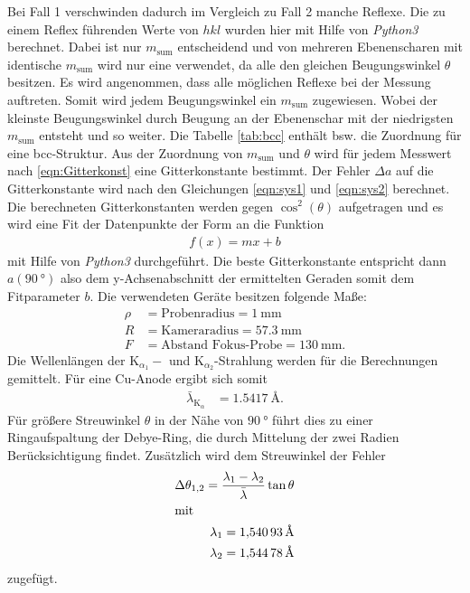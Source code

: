 Bei Fall 1 verschwinden dadurch im Vergleich zu Fall 2 manche
Reflexe.
Die zu einem Reflex führenden Werte von $hkl$ wurden hier mit Hilfe von
\textit{Python3} berechnet. Dabei ist nur $m_{\mathrm{sum}}$ entscheidend
und von mehreren Ebenenscharen mit identische $m_{\mathrm{sum}}$ wird nur eine verwendet,
da alle den gleichen Beugungswinkel $\theta$ besitzen.
Es wird angenommen, dass alle möglichen Reflexe bei der Messung auftreten.
Somit wird jedem Beugungswinkel \theta ein $m_{\mathrm{sum}}$ zugewiesen.
Wobei der kleinste Beugungswinkel durch Beugung an der
Ebenenschar mit der niedrigsten $m_{\mathrm{sum}}$ entsteht und so weiter.
Die Tabelle \ref{tab:bcc} enthält bsw. die Zuordnung für eine bcc-Struktur.
Aus der Zuordnung von $m_{\mathrm{sum}}$ und $\theta$
wird für jedem Messwert nach \eqref{eqn:Gitterkonst}
eine Gitterkonstante bestimmt. Der Fehler $\Delta a$
auf die Gitterkonstante
wird nach den Gleichungen \eqref{eqn:sys1} und \eqref{eqn:sys2}
berechnet. Die berechneten Gitterkonstanten werden
gegen $\cos^2\left(\theta\right)$ aufgetragen und es wird
eine Fit der Datenpunkte der Form an die Funktion
\begin{align}
  f(x)= mx+b
\end{align}
mit Hilfe von \textit{Python3} durchgeführt.
Die beste Gitterkonstante entspricht dann $a(\SI{90}{\degree})$
also dem y-Achsenabschnitt der ermittelten Geraden somit dem Fitparameter $b$.
Die verwendeten Geräte besitzen folgende Maße:
\begin{align*}
  \rho &= \text{Probenradius} = \SI{1}{\milli\meter}\\
  R &= \text{Kameraradius} = \SI{57.3}{\milli\meter}\\
  F &= \text{Abstand Fokus-Probe} = \SI{130}{\milli\meter}.
\end{align*}
Die Wellenlängen der
$\mathrm{K}_{\alpha_1}-$
und $\mathrm{K}_{\alpha_2}$-Strahlung
werden für die Berechnungen gemittelt.
Für eine Cu-Anode ergibt sich somit
\begin{align*}
  \bar{\lambda}_{\mathrm{K}_\alpha} &= \SI{1,5417}{\angstrom}.
\end{align*}
Für größere Streuwinkel $\theta$ in der
Nähe von $\SI{90}{\degree}$
führt dies zu einer Ringaufspaltung
der Debye-Ring, die durch Mittelung der zwei Radien
Berücksichtigung findet. Zusätzlich
wird dem Streuwinkel \theta der Fehler
\begin{align*}
  \Delta\theta_{1,2} = \frac{\lambda_1 - \lambda_2}{\bar{\lambda}}\tan\theta\\
\intertext{mit}
 \lambda_1=\SI{1,54093}{\angstrom}\\
 \lambda_2=\SI{1,54478}{\angstrom}
\end{align*}
zugefügt.
